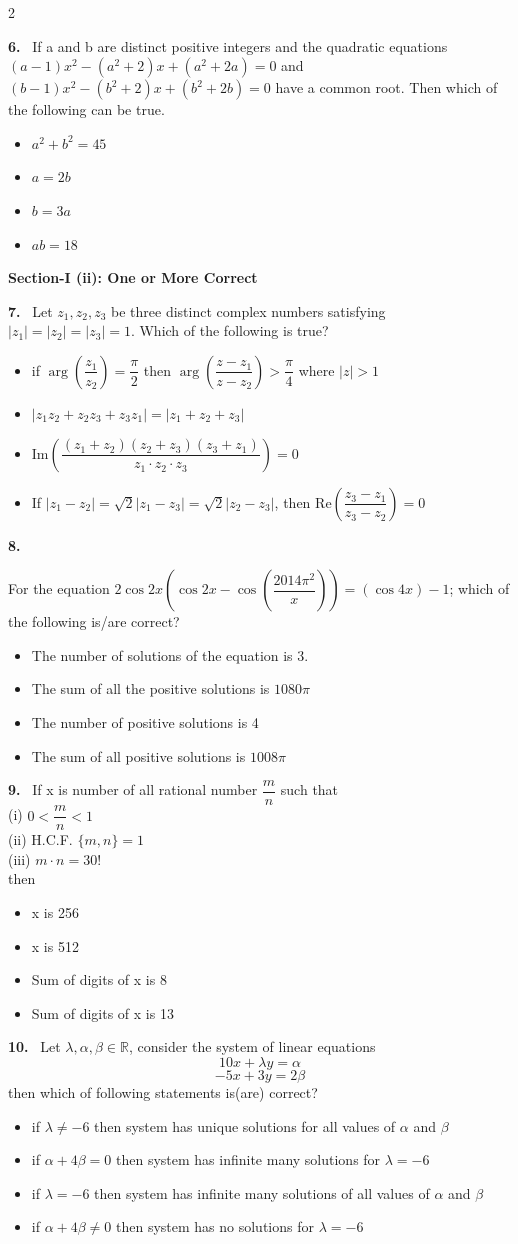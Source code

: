 \documentclass[10pt]{extarticle}
\newcommand{\sect}[1]{\par\smallskip\noindent\textbf{#1}\par}
\newcommand{\qn}[1]{\par\smallskip\noindent\textbf{#1.}~}
\newenvironment{qoptions}{\begin{itemize}[leftmargin=1.8em,itemsep=1pt,topsep=2pt,label={}]}{\end{itemize}}
\newcommand{\opt}[2]{\item[(#1)] #2}
\begin{document}
\begin{multicols}{2}
\qn{6} If a and b are distinct positive integers and the quadratic equations $(a-1)x^2 - (a^2+2)x + (a^2+2a) = 0$ and $(b-1)x^2 - (b^2+2)x + (b^2+2b) = 0$ have a common root. Then which of the following can be true.
\begin{qoptions}
\opt{A}{$a^2+b^2 = 45$}
\opt{B}{$a = 2b$}
\opt{C}{$b = 3a$}
\opt{D}{$ab = 18$}
\end{qoptions}

\sect{Section-I (ii): One or More Correct}

\qn{7} Let $z_1, z_2, z_3$ be three distinct complex numbers satisfying $|z_1| = |z_2| = |z_3| = 1$. Which of the following is true?
\begin{qoptions}
\opt{A}{if $\arg\left(\dfrac{z_1}{z_2}\right) = \dfrac{\pi}{2}$ then $\arg\left(\dfrac{z-z_1}{z-z_2}\right) > \dfrac{\pi}{4}$ where $|z|>1$}
\opt{B}{$|z_1z_2 + z_2z_3 + z_3z_1| = |z_1+z_2+z_3|$}
\opt{C}{$\mathrm{Im}\left(\dfrac{(z_1+z_2)(z_2+z_3)(z_3+z_1)}{z_1\cdot z_2\cdot z_3}\right) = 0$}
\opt{D}{If $|z_1-z_2| = \sqrt{2}|z_1-z_3| = \sqrt{2}|z_2-z_3|$, then $\mathrm{Re}\left(\dfrac{z_3-z_1}{z_3-z_2}\right) = 0$}
\end{qoptions}

\qn{8} {\sloppy For the equation $2\cos 2x\left(\cos 2x - \cos\left(\dfrac{2014\pi^2}{x}\right)\right) = (\cos 4x) - 1$; which of the following is/are correct?\par}
\begin{qoptions}
\opt{A}{The number of solutions of the equation is 3.}
\opt{B}{The sum of all the positive solutions is $1080\pi$}
\opt{C}{The number of positive solutions is 4}
\opt{D}{The sum of all positive solutions is $1008\pi$}
\end{qoptions}

\qn{9} If x is number of all rational number $\dfrac{m}{n}$ such that\\
(i) $0 < \dfrac{m}{n} < 1$\\
(ii) H.C.F. $\{m,n\} = 1$\\
(iii) $m\cdot n = 30!$\\
then
\begin{qoptions}
\opt{A}{x is 256}
\opt{B}{x is 512}
\opt{C}{Sum of digits of x is 8}
\opt{D}{Sum of digits of x is 13}
\end{qoptions}

\qn{10} Let $\lambda, \alpha, \beta \in \mathbb{R}$, consider the system of linear equations
$$10x + \lambda y = \alpha$$
$$-5x + 3y = 2\beta$$
then which of following statements is(are) correct?
\begin{qoptions}
\opt{A}{if $\lambda \neq -6$ then system has unique solutions for all values of $\alpha$ and $\beta$}
\opt{B}{if $\alpha + 4\beta = 0$ then system has infinite many solutions for $\lambda = -6$}
\opt{C}{if $\lambda = -6$ then system has infinite many solutions of all values of $\alpha$ and $\beta$}
\opt{D}{if $\alpha + 4\beta \neq 0$ then system has no solutions for $\lambda = -6$}
\end{qoptions}


\end{multicols}
\end{document}
